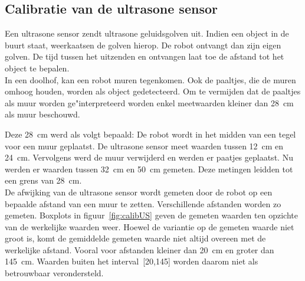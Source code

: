 \documentclass[tt3]{penoverslag}
\begin{document}
\subsection{Calibratie van de ultrasone sensor} %
\label{ssec:calibUS}
Een ultrasone sensor zendt ultrasone geluidsgolven uit. Indien een object in de buurt staat, weerkaatsen de golven hierop. De robot ontvangt dan zijn eigen golven. De tijd tussen het uitzenden en ontvangen laat toe de afstand tot het object te bepalen.\\

In een doolhof, kan een robot muren tegenkomen. Ook de paaltjes, die de muren omhoog houden, worden als object gedetecteerd. Om te vermijden dat de paaltjes als muur worden ge"interpreteerd worden enkel meetwaarden kleiner dan 28~cm als muur beschouwd.

Deze 28~cm werd als volgt bepaald: De robot wordt in het midden van een tegel voor een muur geplaatst. De ultrasone sensor meet waarden tussen 12~cm en 24~cm. Vervolgens werd de muur verwijderd en werden er paatjes geplaatst. Nu werden er waarden tussen 32~cm en 50~cm gemeten. Deze metingen leidden tot een grens van 28~cm.\\

De afwijking van de ultrasone sensor wordt gemeten door de robot op een bepaalde afstand van een muur te zetten. Verschillende afstanden worden zo gemeten. Boxplots in figuur~\ref{fig:calibUS} geven de gemeten waarden ten opzichte van de werkelijke waarden weer. Hoewel de variantie op de gemeten waarde niet groot is, komt de gemiddelde gemeten waarde niet altijd overeen met de werkelijke afstand. Vooral voor afstanden kleiner dan 20~cm en groter dan 145~cm. Waarden buiten het interval~[20,145] worden daarom niet als betrouwbaar verondersteld.
\end{document}
